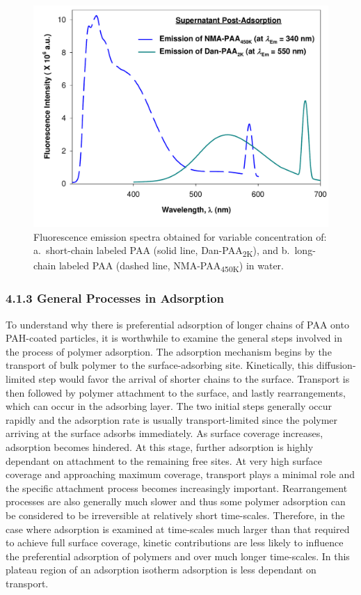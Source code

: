 \documentclass[journal=mamobx,manuscript=article]{achemso}
\begin{document}
\begin{figure}[H]
\includegraphics[scale=0.45]{Figure6_.pdf}
\caption{Fluorescence emission spectra obtained for variable concentration of: a.\ short-chain labeled PAA (solid line, Dan-PAA\textsubscript{2K}), and b.\ long-chain labeled PAA (dashed line, NMA-PAA\textsubscript{450K}) in water.}
\label{figure 6}
\end{figure}



\subsubsection{4.1.3 General Processes in Adsorption}

To understand why there is preferential adsorption of longer chains of PAA onto PAH-coated particles, it is worthwhile to examine the general steps involved in the process of polymer adsorption.  The adsorption mechanism begins by the transport of bulk polymer to the surface-adsorbing site.  Kinetically, this diffusion-limited step would favor the arrival of shorter chains to the surface.  Transport is then followed by polymer attachment to the surface, and lastly rearrangements, which can occur in the adsorbing layer.  The two initial steps generally occur rapidly and the adsorption rate is usually transport-limited since the polymer arriving at the surface adsorbs immediately.\cite{Dijt1990} As surface coverage increases, adsorption becomes hindered.  At this stage, further adsorption is highly dependant on attachment to the remaining free sites.\cite{Hoogeveen1996}  At very high surface coverage and approaching maximum coverage, transport plays a minimal role and the specific attachment process becomes increasingly important.\cite{Hoogeveen1996} Rearrangement processes are also generally much slower and thus some polymer adsorption can be considered to be irreversible at relatively short time-scales.\cite{Cafe1982,Meadows1988}  Therefore, in the case where adsorption is examined at time-scales much larger than that required to achieve full surface coverage, kinetic contributions are less likely to influence the preferential adsorption of polymers and over much longer time-scales.  In this plateau region of an adsorption isotherm adsorption is less dependant on transport.\cite{Hoogeveen1996}
\end{document}
